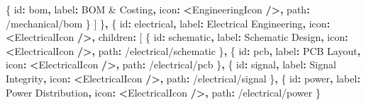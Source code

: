 \documentclass[
]{article}
\newenvironment{Shaded}{\begin{snugshade}}{\end{snugshade}}
\newcommand{\NormalTok}[1]{#1}
\newcommand{\OperatorTok}[1]{\textcolor[rgb]{0.81,0.36,0.00}{\textbf{#1}}}
\newcommand{\StringTok}[1]{\textcolor[rgb]{0.31,0.60,0.02}{#1}}
\begin{document}
\begin{Shaded}
\begin{Highlighting}[]
\NormalTok{      \{ id}\OperatorTok{:} \StringTok{\textquotesingle{}bom\textquotesingle{}}\OperatorTok{,}\NormalTok{ label}\OperatorTok{:} \StringTok{\textquotesingle{}BOM \& Costing\textquotesingle{}}\OperatorTok{,}\NormalTok{ icon}\OperatorTok{:} \OperatorTok{\textless{}}\NormalTok{EngineeringIcon }\OperatorTok{/\textgreater{},}\NormalTok{ path}\OperatorTok{:} \StringTok{\textquotesingle{}/mechanical/bom\textquotesingle{}}\NormalTok{ \}}
\NormalTok{    ]}
\NormalTok{  \}}\OperatorTok{,}
\NormalTok{  \{}
\NormalTok{    id}\OperatorTok{:} \StringTok{\textquotesingle{}electrical\textquotesingle{}}\OperatorTok{,}
\NormalTok{    label}\OperatorTok{:} \StringTok{\textquotesingle{}Electrical Engineering\textquotesingle{}}\OperatorTok{,}
\NormalTok{    icon}\OperatorTok{:} \OperatorTok{\textless{}}\NormalTok{ElectricalIcon }\OperatorTok{/\textgreater{},}
\NormalTok{    children}\OperatorTok{:}\NormalTok{ [}
\NormalTok{      \{ id}\OperatorTok{:} \StringTok{\textquotesingle{}schematic\textquotesingle{}}\OperatorTok{,}\NormalTok{ label}\OperatorTok{:} \StringTok{\textquotesingle{}Schematic Design\textquotesingle{}}\OperatorTok{,}\NormalTok{ icon}\OperatorTok{:} \OperatorTok{\textless{}}\NormalTok{ElectricalIcon }\OperatorTok{/\textgreater{},}\NormalTok{ path}\OperatorTok{:} \StringTok{\textquotesingle{}/electrical/schematic\textquotesingle{}}\NormalTok{ \}}\OperatorTok{,}
\NormalTok{      \{ id}\OperatorTok{:} \StringTok{\textquotesingle{}pcb\textquotesingle{}}\OperatorTok{,}\NormalTok{ label}\OperatorTok{:} \StringTok{\textquotesingle{}PCB Layout\textquotesingle{}}\OperatorTok{,}\NormalTok{ icon}\OperatorTok{:} \OperatorTok{\textless{}}\NormalTok{ElectricalIcon }\OperatorTok{/\textgreater{},}\NormalTok{ path}\OperatorTok{:} \StringTok{\textquotesingle{}/electrical/pcb\textquotesingle{}}\NormalTok{ \}}\OperatorTok{,}
\NormalTok{      \{ id}\OperatorTok{:} \StringTok{\textquotesingle{}signal\textquotesingle{}}\OperatorTok{,}\NormalTok{ label}\OperatorTok{:} \StringTok{\textquotesingle{}Signal Integrity\textquotesingle{}}\OperatorTok{,}\NormalTok{ icon}\OperatorTok{:} \OperatorTok{\textless{}}\NormalTok{ElectricalIcon }\OperatorTok{/\textgreater{},}\NormalTok{ path}\OperatorTok{:} \StringTok{\textquotesingle{}/electrical/signal\textquotesingle{}}\NormalTok{ \}}\OperatorTok{,}
\NormalTok{      \{ id}\OperatorTok{:} \StringTok{\textquotesingle{}power\textquotesingle{}}\OperatorTok{,}\NormalTok{ label}\OperatorTok{:} \StringTok{\textquotesingle{}Power Distribution\textquotesingle{}}\OperatorTok{,}\NormalTok{ icon}\OperatorTok{:} \OperatorTok{\textless{}}\NormalTok{ElectricalIcon }\OperatorTok{/\textgreater{},}\NormalTok{ path}\OperatorTok{:} \StringTok{\textquotesingle{}/electrical/power\textquotesingle{}}\NormalTok{ \}}

\end{Highlighting}
\end{Shaded}
\end{document}

